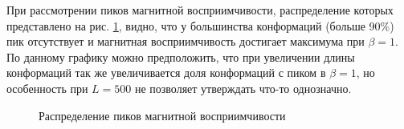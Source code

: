 При рассмотрении пиков магнитной восприимчивости, распределение которых представлено на рис. \ref{fig:MS_peaks_distr}, видно, что у большинства конформаций (больше 90\%) пик отсутствует и магнитная восприимчивость достигает максимума при $\beta = 1$. По данному графику можно предположить, что при увеличении длины конформаций так же увеличивается доля конформаций с пиком в $\beta = 1$, но особенность при $L=500$ не позволяет утверждать что-то однозначно.


\begin{figure}[ht]
	\centering
	
	\caption{Распределение пиков магнитной восприимчивости}
	\label{fig:MS_peaks_distr}
\end{figure}